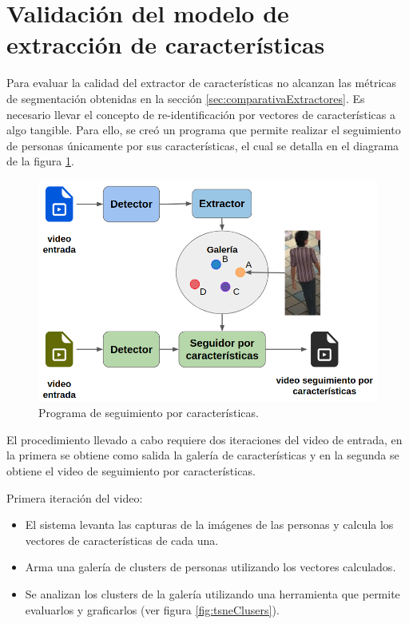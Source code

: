 \section{Validación del modelo de extracción de características}
\label{sec:validExtractor}

Para evaluar la calidad del extractor de características no alcanzan las métricas de segmentación obtenidas en la sección \ref{sec:comparativaExtractores}. Es necesario llevar el concepto de re-identificación por vectores de características a algo tangible. Para ello, se creó un programa que permite realizar el seguimiento de personas únicamente por sus características, el cual se detalla en el diagrama de la figura \ref{fig:seguidorPorCaracteristicas}.

\begin{figure}[ht]
	\centering
	\includegraphics[scale=.60]{./Figures/seguidorPorCaracteristicas.png}
	\caption{Programa de seguimiento por características.}
	\label{fig:seguidorPorCaracteristicas}
\end{figure}

\newpage

El procedimiento llevado a cabo requiere dos iteraciones del video de entrada, en la primera se obtiene como salida la galería de características y en la segunda se obtiene el video de seguimiento por características.

Primera iteración del video:
\begin{itemize}
\item El sistema levanta las capturas de la imágenes de las personas y calcula los vectores de características de cada una.
\item Arma una galería de clusters de personas utilizando los vectores calculados.
\item Se analizan los clusters de la galería utilizando una herramienta que permite evaluarlos y graficarlos (ver figura \ref{fig:tsneClusers}).
\end{itemize}

